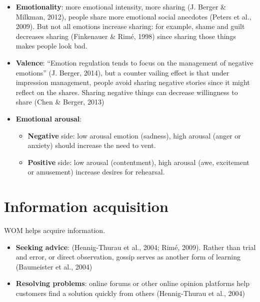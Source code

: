 \documentclass[
]{book}
\providecommand{\tightlist}{%
  \setlength{\itemsep}{0pt}\setlength{\parskip}{0pt}}
\begin{document}
\begin{itemize}
\tightlist
\item
  \textbf{Emotionality}: more emotional intensity, more sharing (J. Berger \& Milkman, 2012), people share more emotional social anecdotes (Peters et al., 2009). But not all emotions increase sharing: for example, shame and guilt decreases sharing (Finkenauer \& Rimé, 1998) since sharing those things makes people look bad.\\
\item
  \textbf{Valence}: ``Emotion regulation tends to focus on the management of negative emotions'' (J. Berger, 2014), but a counter vailing effect is that under impression management, people avoid sharing negative stories since it might reflect on the shares. Sharing negative things can decrease willingness to share (Chen \& Berger, 2013)\\
\item
  \textbf{Emotional arousal}:

  \begin{itemize}
  \tightlist
  \item
    \textbf{Negative} side: low arousal emotion (sadness), high arousal (anger or anxiety) should increase the need to vent.\\
  \item
    \textbf{Positive} side: low arousal (contentment), high arousal (awe, excitement or amusement) increase desires for rehearsal.
  \end{itemize}
\end{itemize}

\hypertarget{information-acquisition}{%
\section{Information acquisition}\label{information-acquisition}}

WOM helps acquire information.

\begin{itemize}
\tightlist
\item
  \textbf{Seeking advice}: (Hennig-Thurau et al., 2004; Rimé, 2009). Rather than trial and error, or direct observation, gossip serves as another form of learning (Baumeister et al., 2004)\\
\item
  \textbf{Resolving problems}: online forums or other online opinion platforms help customers find a solution quickly from others (Hennig-Thurau et al., 2004)
\end{itemize}
\end{document}
